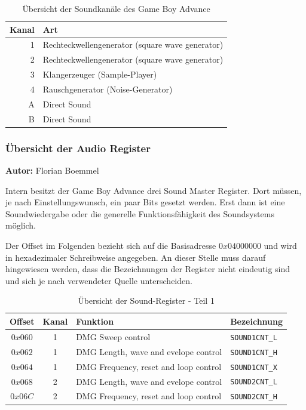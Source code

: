 \documentclass[11pt,a4paper]{scrartcl}
\newcommand{\AutorFlorian} {
    \vspace{-4mm}
    \large \textbf{Autor:} Florian Boemmel \normalsize
    \vspace{2mm}
}
\begin{document}
\begin{table}[h]
    \centering
    \begin{tabular}{ r | p{10cm} }
        \textbf{Kanal} & \textbf{Art} \\
        \hline
        1 & Rechteckwellengenerator (square wave generator) \\
        \hline
        2 & Rechteckwellengenerator (square wave generator) \\
        \hline
        3 & Klangerzeuger (Sample-Player) \\
        \hline
        4 & Rauschgenerator (Noise-Generator) \\
        \hline
        A & Direct Sound \\
        \hline
        B & Direct Sound \\
    \end{tabular}
    \caption{\"Ubersicht der Soundkan\"ale des Game Boy Advance}
    \label{table:TechnischeDaten}
\end{table}


\subsubsection{\"Ubersicht der Audio Register}
\AutorFlorian

Intern besitzt der Game Boy Advance drei Sound Master Register. Dort m\"ussen, je nach Einstellungswunsch, ein paar Bits gesetzt werden. Erst dann ist eine Soundwiedergabe oder die generelle Funktionsf\"ahigkeit des Soundsystems m\"oglich. \cite{GameBoySoundsystem}

Der Offset im Folgenden bezieht sich auf die Basisadresse $0x04000000$ und wird in hexadezimaler Schreibweise angegeben. An dieser Stelle muss darauf hingewiesen werden, dass die Bezeichnungen der Register nicht eindeutig sind und sich je nach verwendeter Quelle unterscheiden.

\begin{table}[h]
    \centering
    \begin{tabular}{ c | c | p{10cm} | l }
        \textbf{Offset} & \textbf{Kanal} & \textbf{Funktion} & \textbf{Bezeichnung} \\
        \hline
        $0x060$ & 1 & DMG Sweep control & \verb|SOUND1CNT_L| \\
        \hline
        $0x062$ & 1 & DMG Length, wave and evelope control & \verb|SOUND1CNT_H| \\
        \hline
        $0x064$ & 1 & DMG Frequency, reset and loop control & \verb|SOUND1CNT_X| \\
        \hline
        $0x068$ & 2 & DMG Length, wave and evelope control & \verb|SOUND2CNT_L| \\
        \hline
        $0x06C$ & 2 & DMG Frequency, reset and loop control & \verb|SOUND2CNT_H| \\
    \end{tabular}
    \caption{\"Ubersicht der Sound-Register - Teil 1}
    \label{table:SoundRegister1}
\end{table}
\end{document}
